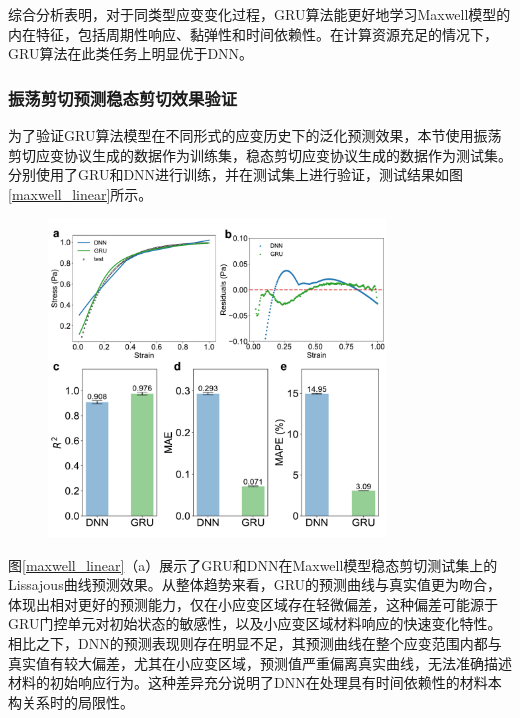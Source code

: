 综合分析表明，对于同类型应变变化过程，GRU算法能更好地学习Maxwell模型的内在特征，包括周期性响应、黏弹性和时间依赖性。在计算资源充足的情况下，GRU算法在此类任务上明显优于DNN。


\subsubsection{振荡剪切预测稳态剪切效果验证}

为了验证GRU算法模型在不同形式的应变历史下的泛化预测效果，本节使用振荡剪切应变协议生成的数据作为训练集，稳态剪切应变协议生成的数据作为测试集。分别使用了GRU和DNN进行训练，并在测试集上进行验证，测试结果如图\ref{maxwell_linear}所示。
\begin{figure}[htbp]
  \centering
  \includegraphics[width=0.8\textwidth]{Fig/maxwell_linear_test.pdf}
\end{figure}
图\ref{maxwell_linear}（a）展示了GRU和DNN在Maxwell模型稳态剪切测试集上的Lissajous曲线预测效果。从整体趋势来看，GRU的预测曲线与真实值更为吻合，体现出相对更好的预测能力，仅在小应变区域存在轻微偏差，这种偏差可能源于GRU门控单元对初始状态的敏感性，以及小应变区域材料响应的快速变化特性。相比之下，DNN的预测表现则存在明显不足，其预测曲线在整个应变范围内都与真实值有较大偏差，尤其在小应变区域，预测值严重偏离真实曲线，无法准确描述材料的初始响应行为。这种差异充分说明了DNN在处理具有时间依赖性的材料本构关系时的局限性。

